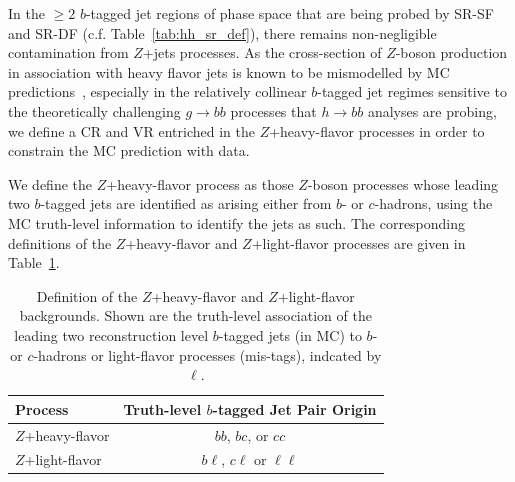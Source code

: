 In the $\ge 2$ $b$-tagged jet regions of phase space that are being probed by SR-SF and SR-DF (c.f. Table~\ref{tab:hh_sr_def}),
there remains non-negligible contamination from $Z$+jets processes.
As the cross-section of $Z$-boson production in association with heavy flavor jets is known to be mismodelled
by MC predictions~\cite{Chatrchyan:2013zja,Aad:2014dvb}, especially in the relatively
collinear $b$-tagged jet regimes sensitive to the theoretically challenging $g \rightarrow bb$ processes
that $h \rightarrow bb$ analyses are probing, we define a CR and VR entriched in the
$Z$+heavy-flavor processes in order to constrain the MC prediction with data.

We define the $Z$+heavy-flavor process as those $Z$-boson processes whose leading two $b$-tagged
jets are identified as arising either from $b$- or $c$-hadrons, using the MC truth-level information
to identify the jets as such.
The corresponding definitions of the $Z$+heavy-flavor and $Z$+light-flavor processes are given
in Table~\ref{tab:zhf_def}.

\begin{table}[!htb]
    \begin{center}
        \caption{
            Definition of the $Z$+heavy-flavor and $Z$+light-flavor backgrounds.
            Shown are the truth-level association of the leading two reconstruction level $b$-tagged
            jets (in MC) to $b$- or $c$-hadrons or light-flavor processes (mis-tags), indcated
            by $\ell$.
        }        
        \label{tab:zhf_def}
        \begin{tabular}{l|c}
        \hline
        \hline
            \textbf{Process} & \textbf{Truth-level $b$-tagged Jet Pair Origin} \\
            \hline
            $Z$+heavy-flavor & $bb$, $bc$, or $cc$ \\
            $Z$+light-flavor & $b \ell$, $c \ell$ or $\ell \ell$ \\
        \hline
        \hline
        \end{tabular}
    \end{center}
\end{table}

